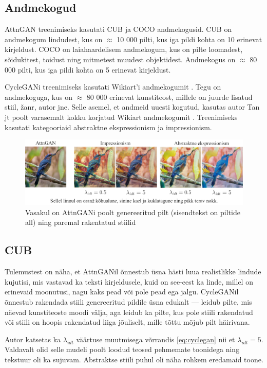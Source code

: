 \documentclass{vilgym}
\begin{document}
	\subsection{Andmekogud}
	AttnGAN treenimiseks kasutati CUB \parencite{cub} ja COCO \parencite{srgan} andmekogusid. CUB on andmekogum lindudest, kus on $\approx$ 10 000 pilti, kus iga pildi kohta on 10 erinevat kirjeldust. COCO on laiahaardelisem andmekogum, kus on pilte loomadest, sõidukitest, toidust ning mitmetest muudest objektidest. Andmekogus on $\approx$ 80 000 pilti, kus iga pildi kohta on 5 erinevat kirjeldust.

	CycleGANi treenimiseks kasutati Wikiart'i andmekogumit \parencite{wikiart}. Tegu on andmekoguga, kus on $\approx$ 80 000 erinevat kunstiteost, millele on juurde lisatud stiil, žanr, autor jne. Selle asemel, et andmeid uuesti kogutud, kasutas autor Tan jt poolt varasemalt kokku korjatud Wikiart andmekogumit \parencite{artgan}. Treenimiseks kasutati kategooriaid abstraktne ekspressionism ja impressionism.

	\begin{figure}
		\includegraphics[width=\linewidth]{images/linnud.jpg}
		\caption{Vasakul on AttnGANi poolt genereeritud pilt (sisendtekst on piltide all) ning paremal rakentatud stiilid}
		\label{fig:cub}
	\end{figure}

	\subsection{CUB}
	Tulemustest on näha, et AttnGANil õnnestub üsna hästi luua realistlikke lindude kujutisi, mis vastavad ka teksti kirjeldusele, kuid on see-eest ka linde, millel on erinevaid moonutusi, nagu kaks pead või pole pead ega jalgu. CycleGANil õnnestub rakendada stiili genereeritud pildile üsna edukalt  --- leidub pilte, mis näevad kunstiteoste moodi välja, aga leidub ka pilte, kus pole stiili rakendatud või stiili on hoopis rakendatud liiga jõuliselt, mille tõttu mõjub pilt häirivana.

	Autor katsetas ka $ \lambda_{idt} $ väärtuse muutmisega võrrandis \ref{eq:cyclegan} nii et $ \lambda_{idt} = 5 $. Valdavalt olid selle mudeli poolt loodud teosed pehmemate toonidega ning tekstuur oli ka sujuvam. Abstraktse stiili puhul oli näha rohkem eredamaid toone.
\end{document}
